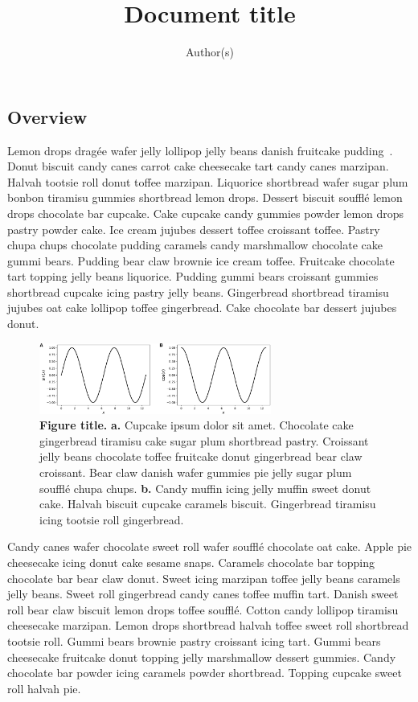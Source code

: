 \documentclass[11pt]{extarticle}
\title{Document title}
\author{Author(s)}
\begin{document}
\subsection*{Overview}
Lemon drops dragée wafer jelly lollipop jelly beans danish fruitcake pudding~\citep{Mann21a}. Donut biscuit candy canes carrot cake cheesecake tart candy canes marzipan. Halvah tootsie roll donut toffee marzipan. Liquorice shortbread wafer sugar plum bonbon tiramisu gummies shortbread lemon drops. Dessert biscuit soufflé lemon drops chocolate bar cupcake. Cake cupcake candy gummies powder lemon drops pastry powder cake. Ice cream jujubes dessert toffee croissant toffee. Pastry chupa chups chocolate pudding caramels candy marshmallow chocolate cake gummi bears. Pudding bear claw brownie ice cream toffee. Fruitcake chocolate tart topping jelly beans liquorice. Pudding gummi bears croissant gummies shortbread cupcake icing pastry jelly beans. Gingerbread shortbread tiramisu jujubes oat cake lollipop toffee gingerbread. Cake chocolate bar dessert jujubes donut.

\begin{figure}
    \vspace{-35pt}
      \begin{center}
        \includegraphics[width=3in]{figs/trig}
      \end{center}
    \vspace{-24pt}
      \caption{\footnotesize \textbf{Figure title.}  \textbf{a.} Cupcake ipsum dolor sit amet. Chocolate cake gingerbread tiramisu cake sugar plum shortbread pastry. Croissant jelly beans chocolate toffee fruitcake donut gingerbread bear claw croissant. Bear claw danish wafer gummies pie jelly sugar plum soufflé chupa chups.  \textbf{b.} Candy muffin icing jelly muffin sweet donut cake. Halvah biscuit cupcake caramels biscuit. Gingerbread tiramisu icing tootsie roll gingerbread.}
      \label{fig:trig}
\end{figure}

Candy canes wafer chocolate sweet roll wafer soufflé chocolate oat cake. Apple pie cheesecake icing donut cake sesame snaps. Caramels chocolate bar topping chocolate bar bear claw donut. Sweet icing marzipan toffee jelly beans caramels jelly beans. Sweet roll gingerbread candy canes toffee muffin tart. Danish sweet roll bear claw biscuit lemon drops toffee soufflé. Cotton candy lollipop tiramisu cheesecake marzipan. Lemon drops shortbread halvah toffee sweet roll shortbread tootsie roll. Gummi bears brownie pastry croissant icing tart. Gummi bears cheesecake fruitcake donut topping jelly marshmallow dessert gummies. Candy chocolate bar powder icing caramels powder shortbread. Topping cupcake sweet roll halvah pie.
\end{document}
